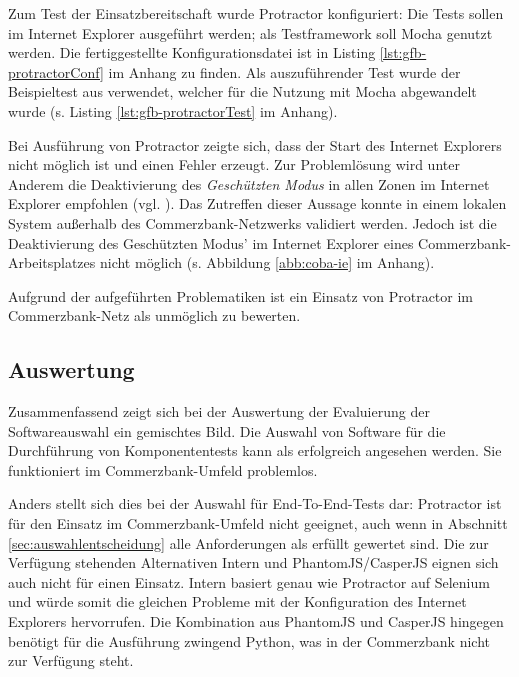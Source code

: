 Zum Test der Einsatzbereitschaft wurde Protractor konfiguriert: Die Tests sollen im Internet Explorer ausgeführt werden; als Testframework soll Mocha genutzt werden. Die fertiggestellte Konfigurationsdatei ist in Listing \ref{lst:gfb-protractorConf} im Anhang zu finden. Als auszuführender Test wurde der Beispieltest aus  \cite{protractor-index} verwendet, welcher für die Nutzung mit Mocha abgewandelt wurde (s. Listing \ref{lst:gfb-protractorTest} im Anhang).

Bei Ausführung von Protractor zeigte sich, dass der Start des Internet Explorers nicht möglich ist und einen Fehler erzeugt. Zur Problemlösung wird unter Anderem die Deaktivierung des \textit{Geschützten Modus} in allen Zonen im Internet Explorer empfohlen (vgl.  \cite{bug-ie-1, bug-ie-2}). Das Zutreffen dieser Aussage konnte in einem lokalen System außerhalb des Commerzbank-Netzwerks validiert werden. Jedoch ist die Deaktivierung des Geschützten Modus' im Internet Explorer eines Commerzbank-Arbeitsplatzes nicht möglich (s. Abbildung \ref{abb:coba-ie} im Anhang).

Aufgrund der aufgeführten Problematiken ist ein Einsatz von Protractor im Commerzbank-Netz als unmöglich zu bewerten.

\subsection{Auswertung}
Zusammenfassend zeigt sich bei der Auswertung der Evaluierung der Softwareauswahl ein gemischtes Bild. Die Auswahl von Software für die Durchführung von Komponententests kann als erfolgreich angesehen werden. Sie funktioniert im Commerzbank-Umfeld problemlos.

Anders stellt sich dies bei der Auswahl für End-To-End-Tests dar: Protractor ist für den Einsatz im Commerzbank-Umfeld nicht geeignet, auch wenn in Abschnitt \ref{sec:auswahlentscheidung} alle Anforderungen als erfüllt gewertet sind. Die zur Verfügung stehenden Alternativen Intern und PhantomJS/CasperJS eignen sich auch nicht für einen Einsatz. Intern basiert genau wie Protractor auf Selenium und würde somit die gleichen Probleme mit der Konfiguration des Internet Explorers hervorrufen. Die Kombination aus PhantomJS und CasperJS hingegen benötigt für die Ausführung zwingend Python, was in der Commerzbank nicht zur Verfügung steht.